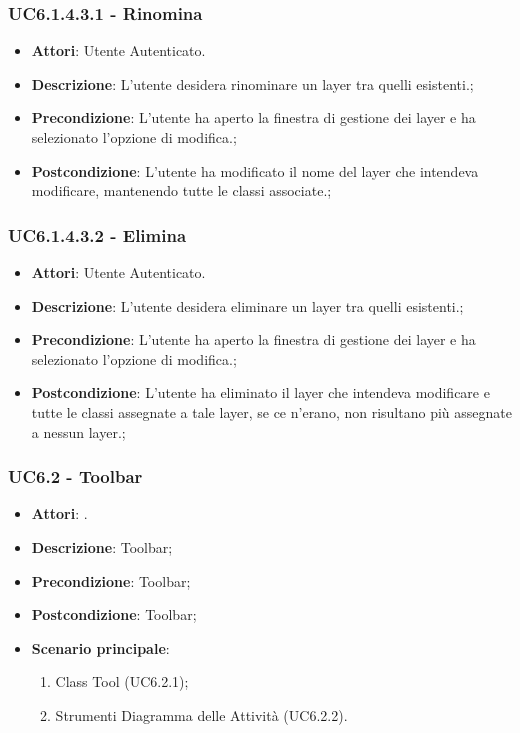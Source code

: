 \subsubsection{UC6.1.4.3.1 - Rinomina} 
\label{sssec:UC6.1.4.3.1} 
\begin{itemize} 
\item \textbf{Attori}: Utente Autenticato.
\item \textbf{Descrizione}: L'utente desidera rinominare un layer tra quelli esistenti.;
\item \textbf{Precondizione}: L'utente ha aperto la finestra di gestione dei layer e ha selezionato l'opzione di modifica.;
\item \textbf{Postcondizione}: L'utente ha modificato il nome del layer che intendeva modificare, mantenendo tutte le classi associate.;
\end{itemize} 
\subsubsection{UC6.1.4.3.2 - Elimina} 
\label{sssec:UC6.1.4.3.2} 
\begin{itemize} 
\item \textbf{Attori}: Utente Autenticato.
\item \textbf{Descrizione}: L'utente desidera eliminare un layer tra quelli esistenti.;
\item \textbf{Precondizione}: L'utente ha aperto la finestra di gestione dei layer e ha selezionato l'opzione di modifica.;
\item \textbf{Postcondizione}: L'utente ha eliminato il layer che intendeva modificare e tutte le classi assegnate a tale layer, se ce n'erano, non risultano più assegnate a nessun layer.;
\end{itemize} 
\subsubsection{UC6.2 - Toolbar} 
\label{sssec:UC6.2} 
\begin{itemize} 
\item \textbf{Attori}: .
\item \textbf{Descrizione}: Toolbar;
\item \textbf{Precondizione}: Toolbar;
\item \textbf{Postcondizione}: Toolbar;
\item \textbf{Scenario principale}: \begin{enumerate}\item Class Tool (UC6.2.1);\item Strumenti Diagramma delle Attività (UC6.2.2). 
 \end{enumerate}
\end{itemize} 
